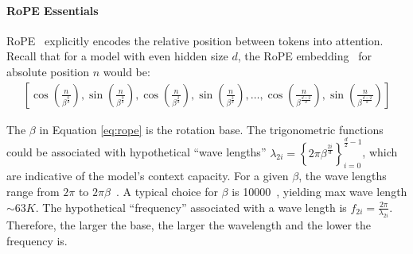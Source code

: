 \documentclass[11pt, a4paper, logo, copyright, nonumbering]{map}
\begin{document}
\paragraph{RoPE Essentials} 
RoPE~\citep{su2024roformer} explicitly encodes the relative position between tokens into attention.
Recall that for a model with even hidden size \(d\), the RoPE embedding~\citep{jianlin_rope_beta_base} for absolute position \(n\) would be:
\begin{align}
    \left[ \cos\left( \frac{n}{\beta^{\frac{0}{d}}} \right), \sin\left( \frac{n}{\beta^{\frac{0}{d}}} \right), \cos\left( \frac{n}{\beta^{\frac{2}{d}}} \right), \sin\left( \frac{n}{\beta^{\frac{2}{d}}}\right), \ldots , \cos\left( \frac{n}{\beta^{\frac{d - 2}{d}}} \right), \sin\left( \frac{n}{\beta^{\frac{d - 2}{d}}} \right)    \right] \label{eq:rope}
\end{align} 

The \(\beta\) in Equation \ref{eq:rope} is the rotation base. The trigonometric functions could be associated with hypothetical ``wave lengths'' \(\lambda_{2i} =\left\{ 2\pi \beta^{\frac{2i}{d}} \right\}_{i = 0}^{\frac{d}{2} - 1} \), which are indicative of the model's context capacity. For a given \(\beta\), the wave lengths range from \(2\pi\) to \(2\pi \beta\)~\citep{peng2023yarn}. A typical choice for \(\beta\) is 10000~\citep{su2024roformer}, yielding max wave length \(\sim 63K\). The hypothetical ``frequency'' associated with a wave length is \(f_{2i} = \frac{2\pi}{\lambda_{2i}}\). Therefore, the larger the base, the larger the wavelength and the lower the frequency is.
\end{document}
